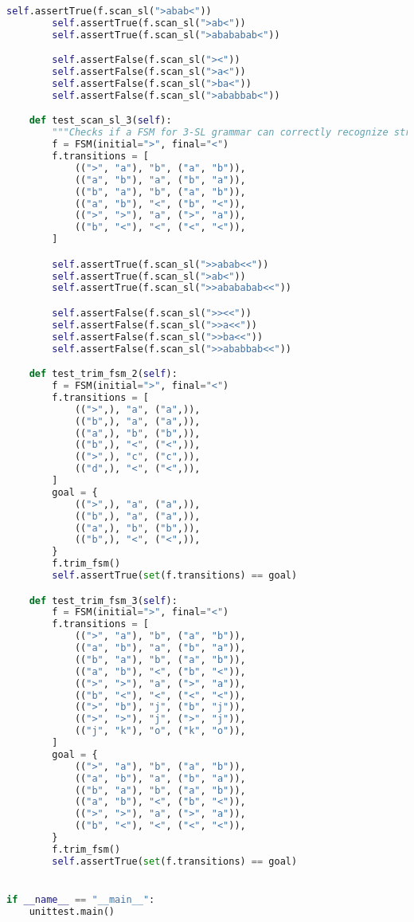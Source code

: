 \begin{lstlisting}[language=Python]
        self.assertTrue(f.scan_sl(">abab<"))
        self.assertTrue(f.scan_sl(">ab<"))
        self.assertTrue(f.scan_sl(">abababab<"))

        self.assertFalse(f.scan_sl("><"))
        self.assertFalse(f.scan_sl(">a<"))
        self.assertFalse(f.scan_sl(">ba<"))
        self.assertFalse(f.scan_sl(">ababbab<"))

    def test_scan_sl_3(self):
        """Checks if a FSM for 3-SL grammar can correctly recognize strings."""
        f = FSM(initial=">", final="<")
        f.transitions = [
            ((">", "a"), "b", ("a", "b")),
            (("a", "b"), "a", ("b", "a")),
            (("b", "a"), "b", ("a", "b")),
            (("a", "b"), "<", ("b", "<")),
            ((">", ">"), "a", (">", "a")),
            (("b", "<"), "<", ("<", "<")),
        ]

        self.assertTrue(f.scan_sl(">>abab<<"))
        self.assertTrue(f.scan_sl(">ab<"))
        self.assertTrue(f.scan_sl(">>abababab<<"))

        self.assertFalse(f.scan_sl(">><<"))
        self.assertFalse(f.scan_sl(">>a<<"))
        self.assertFalse(f.scan_sl(">>ba<<"))
        self.assertFalse(f.scan_sl(">>ababbab<<"))

    def test_trim_fsm_2(self):
        f = FSM(initial=">", final="<")
        f.transitions = [
            ((">",), "a", ("a",)),
            (("b",), "a", ("a",)),
            (("a",), "b", ("b",)),
            (("b",), "<", ("<",)),
            ((">",), "c", ("c",)),
            (("d",), "<", ("<",)),
        ]
        goal = {
            ((">",), "a", ("a",)),
            (("b",), "a", ("a",)),
            (("a",), "b", ("b",)),
            (("b",), "<", ("<",)),
        }
        f.trim_fsm()
        self.assertTrue(set(f.transitions) == goal)

    def test_trim_fsm_3(self):
        f = FSM(initial=">", final="<")
        f.transitions = [
            ((">", "a"), "b", ("a", "b")),
            (("a", "b"), "a", ("b", "a")),
            (("b", "a"), "b", ("a", "b")),
            (("a", "b"), "<", ("b", "<")),
            ((">", ">"), "a", (">", "a")),
            (("b", "<"), "<", ("<", "<")),
            ((">", "b"), "j", ("b", "j")),
            ((">", ">"), "j", (">", "j")),
            (("j", "k"), "o", ("k", "o")),
        ]
        goal = {
            ((">", "a"), "b", ("a", "b")),
            (("a", "b"), "a", ("b", "a")),
            (("b", "a"), "b", ("a", "b")),
            (("a", "b"), "<", ("b", "<")),
            ((">", ">"), "a", (">", "a")),
            (("b", "<"), "<", ("<", "<")),
        }
        f.trim_fsm()
        self.assertTrue(set(f.transitions) == goal)


if __name__ == "__main__":
    unittest.main()

\end{lstlisting}

